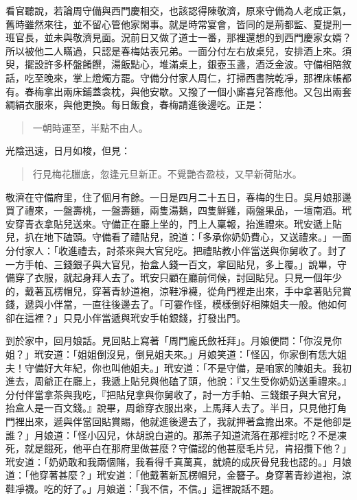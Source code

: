 看官聽說，若論周守備與西門慶相交，也該認得陳敬濟，原來守備為人老成正氣，舊時雖然來往，並不留心管他家閑事。就是時常宴會，皆同的是荊都監、夏提刑一班官長，並未與敬濟見面。況前日又做了道士一番，那裡還想的到西門慶家女婿？所以被他二人瞞過，只認是春梅姑表兄弟。一面分付左右放桌兒，安排酒上來。須臾，擺設許多杯盤餚饌，湯飯點心，堆滿桌上，銀壺玉盞，酒泛金波。守備相陪敘話，吃至晚來，掌上燈燭方罷。守備分付家人周仁，打掃西書院乾凈，那裡床帳都有。春梅拿出兩床鋪蓋衾枕，與他安歇。又撥了一個小廝喜兒答應他。又包出兩套綢絹衣服來，與他更換。每日飯食，春梅請進後邊吃。正是：
\begin{quote}
一朝時運至，半點不由人。
\end{quote}
光陰迅速，日月如梭，但見：
\begin{quote}
行見梅花臘底，忽逢元旦新正。不覺艷杏盈枝，又早新荷貼水。
\end{quote}

敬濟在守備府里，住了個月有餘。一日是四月二十五日，春梅的生日。吳月娘那邊買了禮來，一盤壽桃，一盤壽麵，兩隻湯鵝，四隻鮮雞，兩盤果品，一壇南酒。玳安穿青衣拿貼兒送來。守備正在廳上坐的，門上人稟報，抬進禮來。玳安遞上貼兒，扒在地下磕頭。守備看了禮貼兒，說道：「多承你奶奶費心，又送禮來。」一面分付家人：「收進禮去，討茶來與大官兒吃。把禮貼教小伴當送與你舅收了。封了一方手帕、三錢銀子與大官兒，抬盒人錢一百文，拿回貼兒，多上覆。」說畢，守備穿了衣服，就起身拜人去了。玳安只顧在廳前伺候，討回貼兒。只見一個年少的，戴著瓦楞帽兒，穿著青紗道袍，涼鞋凈襪，從角門裡走出來，手中拿著貼兒賞錢，遞與小伴當，一直往後邊去了。「可霎作怪，模樣倒好相陳姐夫一般。他如何卻在這裡？」只見小伴當遞與玳安手帕銀錢，打發出門。

到於家中，回月娘話。見回貼上寫著「周門龐氏斂衽拜」。月娘便問：「你沒見你姐？」玳安道：「姐姐倒沒見，倒見姐夫來。」月娘笑道：「怪囚，你家倒有恁大姐夫！守備好大年紀，你也叫他姐夫。」玳安道：「不是守備，是咱家的陳姐夫。我初進去，周爺正在廳上，我遞上貼兒與他磕了頭，他說：『又生受你奶奶送重禮來。』分付伴當拿茶與我吃，『把貼兒拿與你舅收了，討一方手帕、三錢銀子與大官兒，抬盒人是一百文錢。』說畢，周爺穿衣服出來，上馬拜人去了。半日，只見他打角門裡出來，遞與伴當回貼賞賜，他就進後邊去了，我就押著盒擔出來。不是他卻是誰？」月娘道：「怪小囚兒，休胡說白道的。那羔子知道流落在那裡討吃？不是凍死，就是餓死，他平白在那府里做甚麼？守備認的他甚麼毛片兒，肯招攬下他？」玳安道：「奶奶敢和我兩個賭，我看得千真萬真，就燒的成灰骨兒我也認的。」月娘道：「他穿著甚麼？」玳安道：「他戴著新瓦楞帽兒，金簪子。身穿著青紗道袍，涼鞋凈襪。吃的好了。」月娘道：「我不信，不信。」這裡說話不題。

